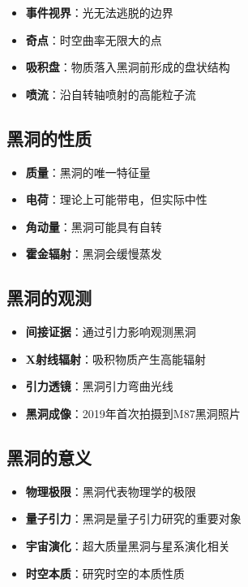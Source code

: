 \documentclass[12pt,UTF8]{ctexbook}
\begin{document}
\begin{itemize}
  \item \textbf{事件视界}：光无法逃脱的边界
  \item \textbf{奇点}：时空曲率无限大的点
  \item \textbf{吸积盘}：物质落入黑洞前形成的盘状结构
  \item \textbf{喷流}：沿自转轴喷射的高能粒子流
\end{itemize}

\subsection{黑洞的性质}

\begin{itemize}
  \item \textbf{质量}：黑洞的唯一特征量
  \item \textbf{电荷}：理论上可能带电，但实际中性
  \item \textbf{角动量}：黑洞可能具有自转
  \item \textbf{霍金辐射}：黑洞会缓慢蒸发
\end{itemize}

\subsection{黑洞的观测}

\begin{itemize}
  \item \textbf{间接证据}：通过引力影响观测黑洞
  \item \textbf{X射线辐射}：吸积物质产生高能辐射
  \item \textbf{引力透镜}：黑洞引力弯曲光线
  \item \textbf{黑洞成像}：2019年首次拍摄到M87黑洞照片
\end{itemize}

\subsection{黑洞的意义}

\begin{itemize}
  \item \textbf{物理极限}：黑洞代表物理学的极限
  \item \textbf{量子引力}：黑洞是量子引力研究的重要对象
  \item \textbf{宇宙演化}：超大质量黑洞与星系演化相关
  \item \textbf{时空本质}：研究时空的本质性质
\end{itemize}
\end{document}

